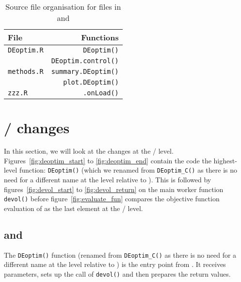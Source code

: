 \documentclass[nojss,shortnames,article]{jss}
\begin{document}
\begin{table}[tb]
  \begin{center}
    \begin{tabular}{lr}
      \toprule
      File                                     & Functions \\ 
      \midrule
      \verb|DEoptim.R| \phantom{XXXXX}        & \verb|DEoptim()| \\
                                                & \verb|DEoptim.control()| \\[6pt]
      \verb|methods.R|                         & \verb|summary.DEoptim()| \\
                                                & \verb|plot.DEoptim()| \\[6pt]
      \verb|zzz.R|                             & \verb|.onLoad()| \\
      \bottomrule
    \end{tabular}
    \caption{Source file organisation for  files in 
    and }
    \label{tab:Rfiles}
  \end{center}
\end{table}


\section[C / C++ changes]{ /  changes}
\label{sec:Cppchanges}

In this section, we will look at the changes at the  /
 level. Figures~\ref{fig:deoptim_start} to
\ref{fig:deoptim_end} contain the code the highest-level 
function: \verb|DEoptim()| (which we renamed from \verb|DEoptim_C()| as there
is no need for a different name at the  level relative to
). This is followed by figures~\ref{fig:devol_start} to
\ref{fig:devol_return} on the main worker function \verb|devol()| before
figure~\ref{fig:evaluate_fun} compares the objective function evaluation of
as the last element at the  /  level.

\subsection[de4_0.c and deoptim.cpp]{ and }

The \verb|DEoptim()| function (renamed from \verb|DEoptim_C()| as there is no need for a different
name at the  level relative to ) is the entry point
from . It receives parameters, sets up the call of \verb|devol()|
and then prepares the return values. 
\end{document}
